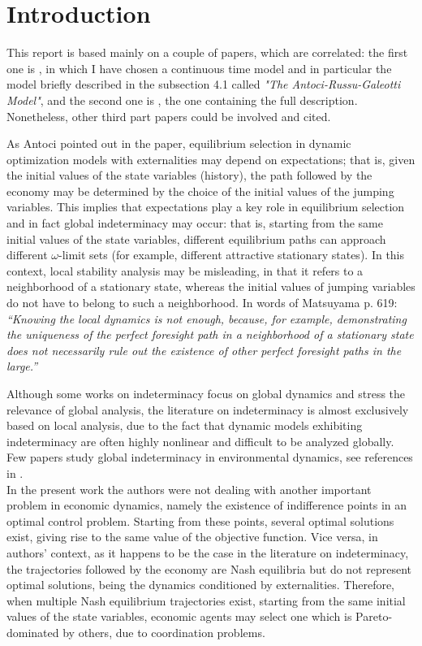 \section{Introduction}\label{Sec:introduction} 
This report is based mainly on a couple of papers, which are correlated: the first one is \cite{caravaggio_nonlinear_2018}, in which I have chosen a continuous time model and in particular the model briefly described in the subsection 4.1 called \textit{"The Antoci-Russu-Galeotti Model"}, and the second one is \cite{antoci_poverty_2011}, the one containing the full description. Nonetheless, other third part papers could be involved and cited. 

As Antoci \cite{antoci_poverty_2011} pointed out in the paper, equilibrium selection in dynamic optimization models with externalities may depend on expectations; that is, given the initial values of the state variables (history), the path followed by the economy may be determined by the choice of the initial values of the jumping variables. This implies that expectations play a key role in equilibrium selection and in fact global indeterminacy may occur: that is, starting from the same initial values of the state variables, different equilibrium paths can approach different $\omega$-limit sets (for example, different attractive stationary states). In this context, local stability analysis may be misleading, in that it refers to a neighborhood of a stationary state, whereas the initial values of jumping variables do not have to belong to such a neighborhood. In words of Matsuyama \cite{matsuyama_increasing_1991} p. 619:
\textit{“Knowing the local dynamics is not enough, because, for example, demonstrating the uniqueness of the perfect foresight path in a neighborhood of a stationary state does not necessarily rule out the existence of other perfect foresight paths in the large.”}

Although some works on indeterminacy focus on global dynamics and stress the relevance of global analysis, the literature on indeterminacy is almost exclusively based on local analysis, due to the fact that dynamic models exhibiting indeterminacy are often highly nonlinear and difficult to be analyzed globally. Few papers study global indeterminacy in environmental dynamics, see references in \cite{antoci_poverty_2011}. \\
In the present work the authors were not dealing with another important problem in economic dynamics, namely the existence of indifference points in an optimal control problem. Starting from these points, several optimal solutions exist, giving rise to the same value of the objective function. Vice versa, in authors' context, as it happens to be the case in the literature on indeterminacy, the trajectories followed by the economy are Nash equilibria but do not represent optimal solutions, being the dynamics conditioned by externalities. Therefore, when multiple Nash equilibrium trajectories exist, starting from the same initial values of the state variables, economic agents may select one which is Pareto-dominated by others, due to coordination problems.

